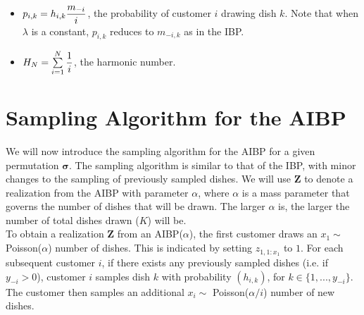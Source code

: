 \begin{itemize}
  \item $p_{i,k} = h_{i,k} \displaystyle\frac{m_{-i}}{i}$, the probability of customer
        $i$ drawing dish $k$. Note that when $\lambda$ is a constant, $p_{i,k}$
        reduces to $m_{-i,k}$ as in the IBP.

  \item $H_N = \sum\limits_{i=1}^{N} \displaystyle\frac{1}{i}$, the harmonic number.
\end{itemize}


\section{Sampling Algorithm for the AIBP}
We will now introduce the sampling algorithm for the AIBP for a given
permutation $\bm\sigma$. The sampling algorithm is similar to that of the IBP,
with minor changes to the sampling of previously sampled dishes. We will use 
$\bm Z$ to denote a realization from the AIBP with parameter $\alpha$, where 
$\alpha$ is a mass parameter that governs the number of dishes that will be drawn.
The larger $\alpha$ is, the larger the number of total dishes drawn ($K$) will be.\\

\noindent
To obtain a realization $\bm Z$ from an AIBP($\alpha$), the first customer
draws an $x_1 \sim$ Poisson($\alpha$) number of dishes. This is indicated by
setting $z_{1,1:x_1}$ to $1$. For each subsequent customer $i$, if there exists
any previously sampled dishes (i.e. if $y_{-i}>0$), customer $i$ samples dish $k$
with probability $\left(h_{i,k}\right)$, for $k \in \{1,...,y_{-i}\}$. The customer
then samples an additional $x_i \sim$ Poisson($\alpha/i$) number of new dishes. 



